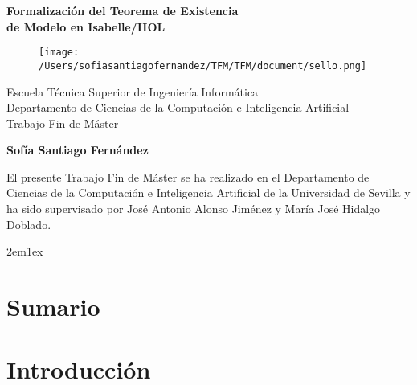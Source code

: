 \documentclass[12pt,a4paper,twoside]{book}
\begin{document}
\begin{titlepage}
 \vspace*{2cm}
  \begin{center}
    {\huge \textbf{Formalización del Teorema de Existencia \\ \vspace*{1em} de Modelo 
                   en Isabelle/HOL}}
  \end{center}
  \vspace{3cm}
  \begin{center}
    \begin{figure}[h]
    \centering
    \texttt{[image: /Users/sofiasantiagofernandez/TFM/TFM/document/sello.png]}
    \end{figure}
  \vspace{3cm}
    {\normalsize Escuela Técnica Superior de Ingeniería Informática} \\
    {\normalsize Departamento de Ciencias de la Computación e Inteligencia Artificial}\\
    {\normalsize Trabajo Fin de Máster} \\
  \end{center}
  \begin{center}
    {\large \textbf{Sofía Santiago Fernández}}
  \end{center}
\end{titlepage}

\newpage

El presente Trabajo Fin de Máster se ha realizado en el Departamento de
Ciencias de la Computación e Inteligencia Artificial de la Universidad
de Sevilla y ha sido supervisado por José Antonio Alonso Jiménez y María
José Hidalgo Doblado.

\newpage

\tableofcontents

\parindent 2em\parskip 1ex

% 
\chapter*{Sumario}

\chapter*{Introducción}

\end{document}
